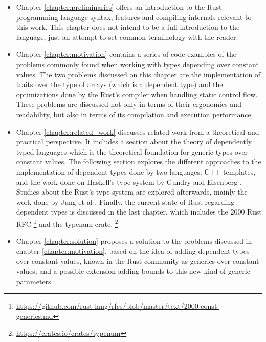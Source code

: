 \begin{itemize}
    \item Chapter \ref{chapter:preliminaries} offers an introduction to the Rust programming language syntax, features and compiling internals relevant to this work. This chapter does not intend to be a full introduction to the language, just an attempt to set common terminology with the reader.
    \item Chapter \ref{chapter:motivation} contains a series of code examples of the problems commonly found when working with types depending over constant values. The two problems discussed on this chapter are the implementation of traits over the type of arrays (which is a dependent type) and the optimizations done by the Rust's compiler when handling static control flow. These problems are discussed not only in terms of their ergonomics and readability, but also in terms of its compilation and execution performance.
    \item Chapter \ref{chapter:related_work} discusses related work from a theoretical and practical perspective. It includes a section about the theory of dependently typed languages which is the theoretical foundation for generic types over constant values. The following section explores the different approaches to the implementation of dependent types done by two languages: C++ templates, and the work done on Haskell's type system by Gundry \cite{gundry} and Eisenberg \cite{eisenberg}. Studies about the Rust's type system are explored afterwards, mainly the work done by Jung et al \cite{ralf}. Finally, the current state of Rust regarding dependent types is discussed in the last chapter, which includes the 2000 Rust RFC \footnote{\url{https://github.com/rust-lang/rfcs/blob/master/text/2000-const-generics.md}} and the typenum crate. \footnote{\url{https://crates.io/crates/typenum}}
    \item Chapter \ref{chapter:solution} proposes a solution to the problems discussed in chapter \ref{chapter:motivation}, based on the idea of adding dependent types over constant values, known in the Rust community as generics over constant values, and a possible extension adding bounds to this new kind of generic parameters.
\end{itemize}
